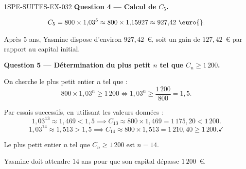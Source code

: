 \begin{corrige}{1SPE-SUITES-EX-032}
\medskip
\textbf{Question 4 — Calcul de $C_5$.}

\[
  C_5 = 800 \times 1{,}03^5 \approx 800 \times 1{,}15927 \approx 927{,}42 \text{ \euro{}}.
\]

Après $5$ ans, Yasmine dispose d'environ $927{,}42$~\euro{}, soit un gain de $127{,}42$~\euro{} par rapport au capital initial.

\medskip
\textbf{Question 5 — Détermination du plus petit $n$ tel que $C_n \geq 1\,200$.}

On cherche le plus petit entier $n$ tel que :
\[
  800 \times 1{,}03^n \geq 1\,200 \iff 1{,}03^n \geq \frac{1\,200}{800} = 1{,}5.
\]


Par essais successifs, en utilisant les valeurs données :
\[
  1{,}03^{13} \approx 1{,}469 < 1{,}5 \implies C_{13} \approx 800 \times 1{,}469 = 1\,175{,}20 < 1\,200.
\]
\[
  1{,}03^{14} \approx 1{,}513 > 1{,}5 \implies C_{14} \approx 800 \times 1{,}513 = 1\,210{,}40 \geq 1\,200. \checkmark
\]

Le plus petit entier $n$ tel que $C_n \geq 1\,200$ est $\boxed{n = 14}$.

Yasmine doit attendre $14$ ans pour que son capital dépasse $1\,200$~\euro{}.

\end{corrige}
